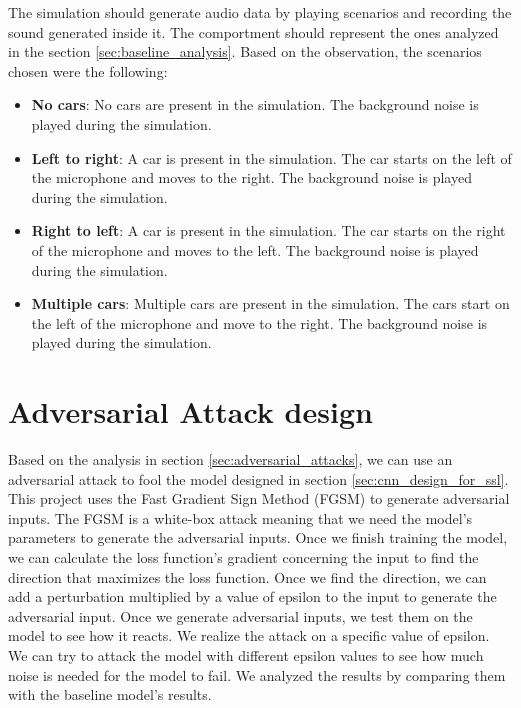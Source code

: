 The simulation should generate audio data by playing scenarios and recording the sound generated inside it. The comportment should represent the ones analyzed in the section \ref{sec:baseline_analysis}. Based on the observation, the scenarios chosen were the following:

\begin{itemize}
    \item \textbf{No cars}: No cars are present in the simulation. The background noise is played during the simulation.
    \item \textbf{Left to right}: A car is present in the simulation. The car starts on the left of the microphone and moves to the right. The background noise is played during the simulation.
    \item \textbf{Right to left}: A car is present in the simulation. The car starts on the right of the microphone and moves to the left. The background noise is played during the simulation.
    \item \textbf{Multiple cars}: Multiple cars are present in the simulation. The cars start on the left of the microphone and move to the right. The background noise is played during the simulation.
\end{itemize}

\section{Adversarial Attack design}
\label{sec:adversarial_attack_design}

Based on the analysis in section \ref{sec:adversarial_attacks}, we can use an adversarial attack to fool the model designed in section \ref{sec:cnn_design_for_ssl}. This project uses the Fast Gradient Sign Method (FGSM) to generate adversarial inputs. The FGSM is a white-box attack meaning that we need the model's parameters to generate the adversarial inputs. Once we finish training the model, we can calculate the loss function's gradient concerning the input to find the direction that maximizes the loss function. Once we find the direction, we can add a perturbation multiplied by a value of epsilon to the input to generate the adversarial input. 
Once we generate adversarial inputs, we test them on the model to see how it reacts. We realize the attack on a specific value of epsilon. We can try to attack the model with different epsilon values to see how much noise is needed for the model to fail. We analyzed the results by comparing them with the baseline model's results.

